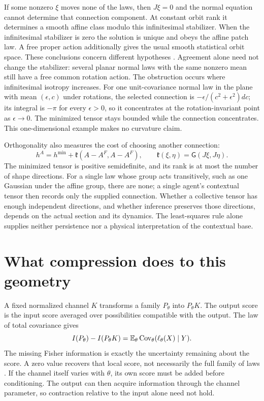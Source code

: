 If some nonzero $\xi$ moves none of the laws, then $J\xi=0$ and the normal equation cannot determine that connection component. At constant orbit rank it determines a smooth affine class modulo this infinitesimal stabilizer. When the infinitesimal stabilizer is zero the solution is unique and obeys the affine patch law. A free proper action additionally gives the usual smooth statistical orbit space. These conclusions concern different hypotheses \citep{LewisNigamOlver2005}. Agreement alone need not change the stabilizer: several planar normal laws with the same nonzero mean still have a free common rotation action. The obstruction occurs where infinitesimal isotropy increases. For one unit-covariance normal law in the plane with mean $(\epsilon,c)$ under rotations, the selected connection is $-\epsilon/(c^2+\epsilon^2)dc$; its integral is $-\pi$ for every $\epsilon>0$, so it concentrates at the rotation-invariant point as $\epsilon\to0$. The minimized tensor stays bounded while the connection concentrates. This one-dimensional example makes no curvature claim.

Orthogonality also measures the cost of choosing another connection:
\begin{equation}
h^A=h^{\min}
+\mathfrak k(A-A^F,A-A^F),
\qquad
\mathfrak k(\xi,\eta)=\mathsf G(J\xi,J\eta).
\end{equation}
The minimized tensor is positive semidefinite, and its rank is at most the number of shape directions. For a single law whose group acts transitively, such as one Gaussian under the affine group, there are none; a single agent's contextual tensor then records only the supplied connection. Whether a collective tensor has enough independent directions, and whether inference preserves those directions, depends on the actual section and its dynamics. The least-squares rule alone supplies neither persistence nor a physical interpretation of the contextual base.

\section{What compression does to this geometry}

A fixed normalized channel $K$ transforms a family $P_\theta$ into $P_\theta K$. The output score is the input score averaged over possibilities compatible with the output. The law of total covariance gives
\begin{equation}
I(P_\theta)-I(P_\theta K)
=\mathbb E_\theta\operatorname{Cov}_\theta(\ell_\theta(X)\mid Y).
\end{equation}
The missing Fisher information is exactly the uncertainty remaining about the score. A zero value recovers that local score, not necessarily the full family of laws \citep{Pollard2013}. If the channel itself varies with $\theta$, its own score must be added before conditioning. The output can then acquire information through the channel parameter, so contraction relative to the input alone need not hold.

